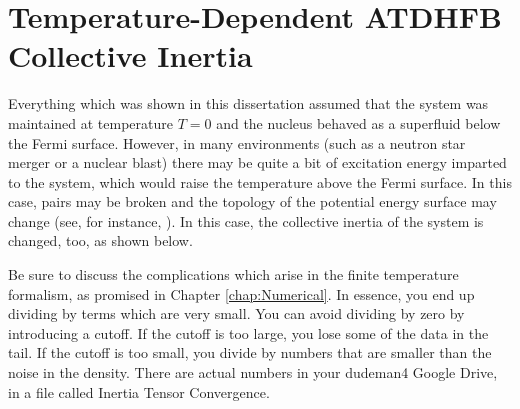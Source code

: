 \chapter{Temperature-Dependent ATDHFB Collective Inertia}\label{append:TD-ATDHFB}


Everything which was shown in this dissertation assumed that the system was maintained at temperature $T=0$ and the nucleus behaved as a superfluid below the Fermi surface. However, in many environments (such as a neutron star merger or a nuclear blast) there may be quite a bit of excitation energy imparted to the system, which would raise the temperature above the Fermi surface. In this case, pairs may be broken and the topology of the potential energy surface may change (see, for instance, \cite{Mcdonnell2014}). In this case, the collective inertia of the system is changed, too, as shown below.

Be sure to discuss the complications which arise in the finite temperature formalism, as promised in Chapter \ref{chap:Numerical}. In essence, you end up dividing by terms which are very small. You can avoid dividing by zero by introducing a cutoff. If the cutoff is too large, you lose some of the data in the tail. If the cutoff is too small, you divide by numbers that are smaller than the noise in the density. There are actual numbers in your dudeman4 Google Drive, in a file called Inertia Tensor Convergence.